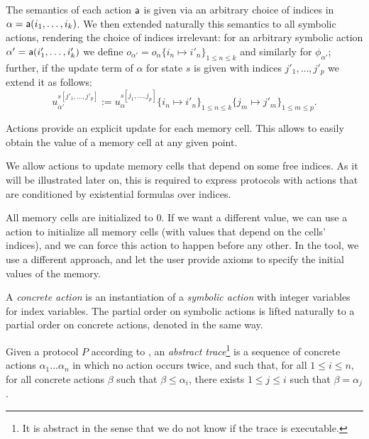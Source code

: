 The semantics of each action $\textsf{a}$ is given via an arbitrary
choice of indices in $\alpha = \textsf{a}(i_1,\ldots,i_k)$.
We then extended naturally this semantics to all symbolic actions,
rendering the choice of indices irrelevant:
for an arbitrary symbolic action $\alpha' =
\textsf{a}(i'_1,\ldots,i'_k)$ we define
$o_{\alpha'} = o_\alpha\{i_n\mapsto i'_n\}_{1\leq n \leq k}$
and similarly for $\phi_{\alpha'}$;
further, if the update term of $\alpha$ for state $s$ is given
with indices $j'_1,\ldots,j'_p$ we extend it as follows:
$$ u_{\alpha'}^{s[j'_1,\ldots,j'_p]} :=
   u_\alpha^{s[j_1,\ldots,j_p]}\{i_n\mapsto i'_n\}_{1 \leq n \leq k}
                                \{j_m\mapsto j'_m\}_{1 \leq m \leq p}.$$

\begin{remark}
  Actions provide an explicit update for each memory cell. This
  allows to easily obtain the value of a memory cell at any given point.

  We allow actions to update memory cells that depend on some free indices.  As
  it will be illustrated later on, this is required to express protocols with
  actions that are conditioned by existential formulas over indices.

  All memory cells are initialized to $0$. If we want a different value, we can use a action to initialize all memory cells (with values that depend on the cells'
  indices), and we can force this action to happen before any other.
  In the tool, we use a different approach, and let the user provide axioms to specify the initial values of the memory.
\end{remark}

\begin{definition}
  A \emph{concrete action} is an instantiation of a \emph{symbolic action}
  with integer variables for index variables. The partial order on symbolic
  actions is lifted naturally to a partial order on concrete actions, denoted
  in the same way.
\end{definition}

\begin{definition}
  \label{def:trace}
  Given a protocol $P$ according to ,
  an \emph{abstract trace}\footnote{
    It is abstract in the sense that we do not know if the trace
    is executable.} is a sequence of concrete actions
  $\alpha_1 \dots \alpha_n$
  in which no action occurs twice, and such that,
  for all $1 \leq i \leq n$,
  for all concrete actions $\beta$ such that $\beta \leq \alpha_i$,
  there exists $1 \leq j \leq i$ such that $\beta = \alpha_j$.
\end{definition}

